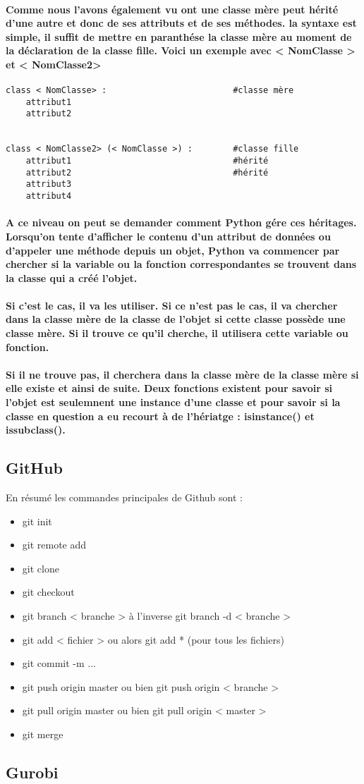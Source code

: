 \documentclass[a4paper, 12pt, twoside]{article}
\begin{document}
\paragraph{Comme nous l'avons également vu ont une classe mère peut hérité d'une autre et donc de ses attributs et de ses méthodes. la syntaxe est simple, il suffit de mettre en paranthése la classe mère au moment de la déclaration de la classe fille. Voici un exemple avec < NomClasse > et < NomClasse2>}
\begin{verbatim}
class < NomClasse> :                         #classe mère
    attribut1
    attribut2 


class < NomClasse2> (< NomClasse >) :        #classe fille
    attribut1                                #hérité 
    attribut2                                #hérité 
    attribut3   
    attribut4
\end{verbatim}
\paragraph{ A ce niveau on peut se demander comment Python gére ces héritages. Lorsqu’on tente d’afficher le contenu d’un attribut de données
ou d’appeler une méthode depuis un objet, Python va commencer par chercher si la variable ou la fonction correspondantes se trouvent dans la classe qui a créé l’objet.}
\paragraph{ Si c’est le cas, il va les utiliser. Si ce n’est pas le cas, il va chercher dans la classe mère de la classe de l’objet si cette classe possède une classe mère. Si il trouve ce qu’il cherche, il utilisera cette variable ou fonction.}
\paragraph{Si il ne trouve pas, il cherchera dans la classe mère de la classe mère si elle existe et ainsi de suite. Deux fonctions existent pour savoir si l'objet est seulemnent  une instance d'une classe et pour savoir si la classe en question a eu recourt à de l'hériatge : isinstance() et issubclass(). }
\subsection{GitHub}
En résumé les commandes principales de Github sont : 
\begin{itemize}
\item  git init 
\item git remote add 
\item  git clone 
\item  git checkout 
\item git branch < branche > à l'inverse  git branch -d < branche > 
\item git add < fichier > ou alors  git add * (pour tous les fichiers) 
\item  git commit -m ... 
\item  git push origin master ou bien  git push origin < branche > 
\item  git pull origin master   ou bien git pull origin < master > 
\item  git merge 
\end{itemize}
\subsection{Gurobi}
\newpage
\listoffigures
\end{document}
